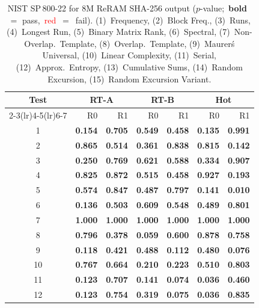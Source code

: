 \begin{table}[t!]
	\centering
	\footnotesize
	\caption{NIST SP\,800-22 for 8M ReRAM SHA-256 output ($p$-value;~\textbf{bold}~$=$ pass,~\textcolor{red}{red}~$=$~fail). (1)~Frequency, (2)~Block Freq., (3)~Runs, (4)~Longest Run, (5)~Binary Matrix Rank, (6)~Spectral, (7)~Non-Overlap.~Template, (8)~Overlap.~Template, (9)~Maurer\'s Universal, (10)~Linear Complexity, (11)~Serial, (12)~Approx.~Entropy, (13)~Cumulative Sums, (14)~Random Excursion, (15)~Random Excursion Variant.}
	\label{tab:nist22}
	\begin{tabular*}{\columnwidth}{@{\extracolsep{\fill}}crrrrrr}
		\toprule
		Test & \multicolumn{2}{c}{RT-A} & \multicolumn{2}{c}{RT-B} & \multicolumn{2}{c}{Hot} \\
		\cmidrule(lr){2-3}\cmidrule(lr){4-5}\cmidrule(lr){6-7}
		& R0 & R1 & R0 & R1 & R0 & R1 \\
		\midrule
		1 & \textbf{0.154} & \textbf{0.705} & \textbf{0.549} & \textbf{0.458} & \textbf{0.135} & \textbf{0.991} \\
		2 & \textbf{0.865} & \textbf{0.514} & \textbf{0.361} & \textbf{0.838} & \textbf{0.815} & \textbf{0.142} \\
		3 & \textbf{0.250} & \textbf{0.769} & \textbf{0.621} & \textbf{0.588} & \textbf{0.334} & \textbf{0.907} \\
		4 & \textbf{0.825} & \textbf{0.872} & \textbf{0.515} & \textbf{0.458} & \textbf{0.927} & \textbf{0.193} \\
		5 & \textbf{0.574} & \textbf{0.847} & \textbf{0.487} & \textbf{0.797} & \textbf{0.141} & \textbf{0.010} \\
		6 & \textbf{0.136} & \textbf{0.503} & \textbf{0.609} & \textbf{0.548} & \textbf{0.489} & \textbf{0.801} \\
		7 & \textbf{1.000} & \textbf{1.000} & \textbf{1.000} & \textbf{1.000} & \textbf{1.000} & \textbf{1.000} \\
		8 & \textbf{0.796} & \textbf{0.378} & \textbf{0.059} & \textbf{0.600} & \textbf{0.878} & \textbf{0.758} \\
		9 & \textbf{0.118} & \textbf{0.421} & \textbf{0.488} & \textbf{0.112} & \textbf{0.480} & \textbf{0.076} \\
		10 & \textbf{0.767} & \textbf{0.664} & \textbf{0.210} & \textbf{0.223} & \textbf{0.510} & \textbf{0.803} \\
		11 & \textbf{0.123} & \textbf{0.707} & \textbf{0.141} & \textbf{0.074} & \textbf{0.036} & \textbf{0.460} \\
		12 & \textbf{0.123} & \textbf{0.754} & \textbf{0.319} & \textbf{0.075} & \textbf{0.036} & \textbf{0.835} \\

\end{tabular*}
\end{table}
